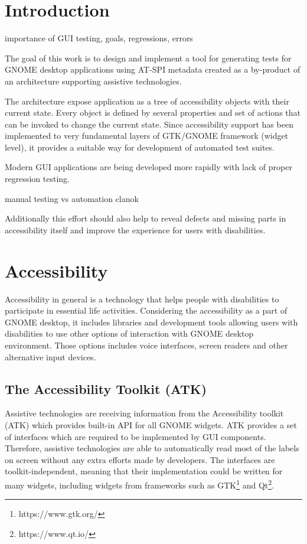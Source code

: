 
\chapter{Introduction}
importance of GUI testing, goals, regressions, errors 

The goal of this work is to design and implement a tool for generating tests for GNOME desktop applications using AT-SPI metadata created as a by-product of an architecture supporting assistive technologies.

The architecture expose application as a tree of accessibility objects with their current state. Every object is defined by several properties and set of actions that can be invoked to change the current state. Since accessibility support has been implemented to very fundamental layers of GTK/GNOME framework (widget level), it provides a suitable way for development of automated test suites.\cite{pyatspi2} 

Modern GUI applications are being developed more rapidly with lack of proper regression testing. 

manual testing vs automation clanok


Additionally this effort should also help to reveal defects and missing parts in accessibility itself and improve the experience for users with disabilities.

\chapter{Accessibility}
Accessibility in general is a technology that helps people with disabilities to participate in essential life activities. Considering the accessibility as a part of GNOME desktop, it includes libraries and development tools allowing users with disabilities to use other options of interaction with GNOME desktop environment. Those options includes voice interfaces, screen readers and other alternative input devices.\cite{gnomeADG}
\section{The Accessibility Toolkit (ATK)}
Assistive technologies are receiving information from the Accessibility toolkit (ATK) which provides built-in API for all GNOME widgets. ATK provides a set of interfaces which are required to be implemented by GUI components. Therefore, assistive technologies are able to automatically read most of the labels on screen without any extra efforts made by developers. The interfaces are toolkit-independent, meaning that their implementation could be written for many widgets, including widgets from frameworks such as GTK\footnote{https://www.gtk.org/} and Qt\footnote{https://www.qt.io/}.

